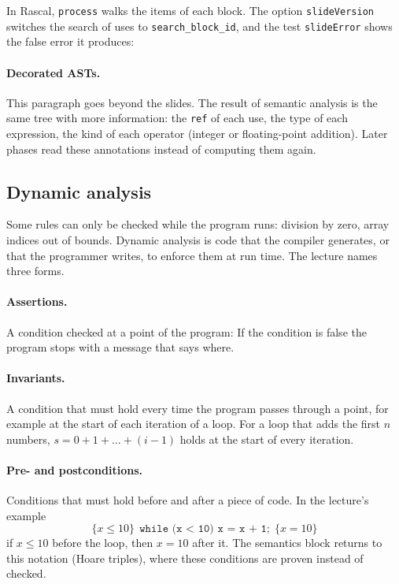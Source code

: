 In Rascal, \texttt{process} walks the items of each block. The option
\texttt{slideVersion} switches the search of uses to \texttt{search\_block\_id},
and the test \texttt{slideError} shows the false error it produces:

\paragraph{Decorated ASTs.} This paragraph goes beyond the slides. The result
of semantic analysis is the same tree with more information: the \texttt{ref}
of each use, the type of each expression, the kind of each operator (integer
or floating-point addition). Later phases read these annotations instead of
computing them again.

\subsection{Dynamic analysis}

Some rules can only be checked while the program runs: division by zero,
array indices out of bounds. Dynamic analysis is code that the compiler
generates, or that the programmer writes, to enforce them at run time. The
lecture names three forms.

\paragraph{Assertions.} A condition checked at a point of the program:
If the condition is false the program stops with a message that says where.

\paragraph{Invariants.} A condition that must hold every time the program
passes through a point, for example at the start of each iteration of a
loop. For a loop that adds the first $n$ numbers, $s = 0 + 1 + \dots + (i - 1)$
holds at the start of every iteration.

\paragraph{Pre- and postconditions.} Conditions that must hold before and after
a piece of code. In the lecture's example
\[
\{x \le 10\}\ \ \texttt{while (x < 10) x = x + 1;}\ \ \{x = 10\}
\]
if $x \le 10$ before the loop, then $x = 10$ after it. The semantics block
returns to this notation (Hoare triples), where these conditions are proven
instead of checked.

